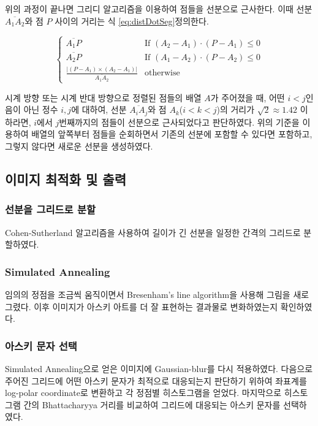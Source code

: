 \documentclass[conference]{IEEEtran}
\begin{document}
\indent 위의 과정이 끝나면 그리디 알고리즘을 이용하여 점들을 선분으로 근사한다.
이때 선분$\overline{A_1A_2}$와 점 $P$ 사이의 거리는 식 \ref{eq:distDotSeg}\로 정의한다.

\begin{equation}
    \begin{cases}
        \overline{A_1P} & \text{If } (A_2 - A_1) \cdot (P - A_1) \leq 0 \\
        \overline{A_2P} & \text{If } (A_1 - A_2) \cdot (P - A_2) \leq 0 \\
        \frac{|(P - A_1)\times (A_2 - A_1)|}{\overline{A_1A_2}} & \text{otherwise}
    \end{cases}
    \label{eq:distDotSeg}
\end{equation}

\indent 시계 방향 또는 시계 반대 방향으로 정렬된 점들의 배열 $A$가 주어졌을 때, 어떤 $i < j$인 음이 아닌 정수 $i, j$에 대하여,
선분 $\overline{A_iA_j}$와 점 $A_k$($i < k < j$)의 거리가 $\sqrt 2 \approx 1.42$ 이하라면, $i$에서 $j$번째까지의 점들이 선분으로 근사되었다고 판단하였다.
위의 기준을 이용하여 배열의 앞쪽부터 점들을 순회하면서 기존의 선분에 포함할 수 있다면 포함하고, 그렇지 않다면 새로운 선분을 생성하였다.

\subsection{이미지 최적화 및 출력}

\subsubsection{선분을 그리드로 분할}

Cohen-Sutherland 알고리즘\cite{cohen-sutherland}을 사용하여 길이가 긴 선분을 일정한 간격의 그리드로 분할하였다.

\subsubsection{Simulated Annealing}

임의의 정점을 조금씩 움직이면서 Bresenham's line algorithm\cite{bresenham-line}을 사용해 그림을 새로 그렸다.
이후 이미지가 아스키 아트를 더 잘 표현하는 결과물로 변화하였는지 확인하였다.

\subsubsection{아스키 문자 선택}

Simulated Annealing으로 얻은 이미지에 Gaussian-blur를 다시 적용하였다.
다음으로 주어진 그리드에 어떤 아스키 문자가 최적으로 대응되는지 판단하기 위하여 좌표계를 log-polar coordinate로 변환하고 각 정점별 히스토그램을 얻었다.\cite{log-polar}
마지막으로 히스토그램 간의 Bhattacharyya 거리를 비교하여 그리드에 대응되는 아스키 문자를 선택하였다.\cite{st-ba-ascii-art}\cite{bhattacharyya}
\end{document}
